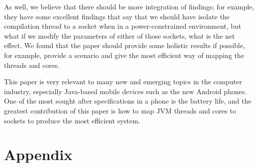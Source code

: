 \documentclass[conference]{IEEEtran}
\begin{document}
As well, we believe that there should be more integration of findings; for example, they have some excellent findings that say that we should have isolate the compilation thread to a socket when in a power-constrained environment, but what if we modify the parameters of either of those sockets, what is the net effect.  We found that the paper should provide some holistic results if possible, for example, provide a scenario and give the most efficient way of mapping the threads and cores.

This paper is very relevant to many new and emerging topics in the computer industry, especially Java-based mobile devices such as the new Android phones.  One of the most sought after specifications in a phone is the battery life, and the greatest contribution of this paper is how to map JVM threads and cores to sockets to produce the most efficient system.

\section{Appendix}



\balance



\end{document}
